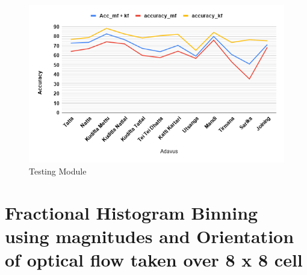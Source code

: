 \begin{figure}[H]
    \hspace{-2.5cm}
    \includegraphics[scale= 0.8]{./Pictures/global.png}
    \caption{Testing Module}
    \label{fig:Ch06F002}
\end{figure}


\section{Fractional Histogram Binning using  magnitudes and Orientation of optical flow taken over 8 x 8 cell}



